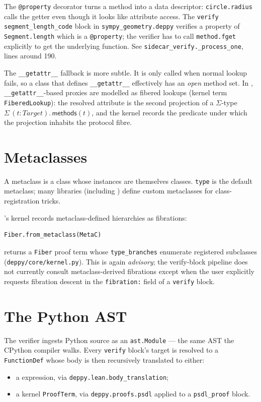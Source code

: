The \verb|@property| decorator turns a method into a data
descriptor: \verb|circle.radius| calls the getter even though it
looks like attribute access.  The \verb|verify segment_length_code|
block in \texttt{sympy\_geometry.deppy} verifies a property of
\verb|Segment.length| which is a \verb|@property|; the verifier has
to call \verb|method.fget| explicitly to get the underlying
function.  See \verb|sidecar_verify._process_one|, lines around 190.

The \verb|__getattr__| fallback is more subtle.  It is only called
when normal lookup fails, so a class that defines
\verb|__getattr__| effectively has an \emph{open} method set.  In
\Deppy{}, \verb|__getattr__|-based proxies are modelled as
fibered lookups (kernel term \verb|FiberedLookup|): the resolved
attribute is the second projection of a $\Sigma$-type
$\Sigma\,(t : \mathit{Target}).\, \mathsf{methods}(t)$, and the
kernel records the predicate under which the projection inhabits the
protocol fibre.

\section{Metaclasses}
\label{sec:metaclasses}

A metaclass is a class whose instances are themselves classes.
\verb|type| is the default metaclass; many libraries (including
\Sympy) define custom metaclasses for class-registration tricks.

\Deppy{}'s kernel records metaclass-defined hierarchies as
fibrations:
\begin{lstlisting}[language=psdl]
Fiber.from_metaclass(MetaC)
\end{lstlisting}
returns a \verb|Fiber| proof term whose \verb|type_branches|
enumerate registered subclasses
(\verb|deppy/core/kernel.py|).  This is again \emph{advisory}; the
verify-block pipeline does not currently consult metaclass-derived
fibrations except when the user explicitly requests fibration
descent in the \verb|fibration:| field of a \verb|verify| block.

\section{The Python AST}
\label{sec:ast}

The verifier ingests Python source as an \verb|ast.Module| --- the
same AST the CPython compiler walks.  Every \verb|verify| block's
target is resolved to a \verb|FunctionDef| whose body is then
recursively translated to either:
\begin{itemize}[leftmargin=1.7em]
  \item a \Lean{} expression, via
    \verb|deppy.lean.body_translation|;
  \item a kernel \verb|ProofTerm|, via
    \verb|deppy.proofs.psdl| applied to a \verb|psdl_proof| block.
\end{itemize}


